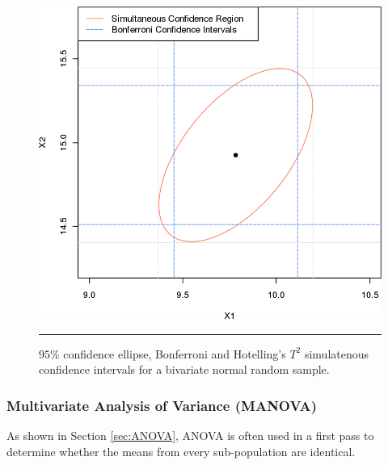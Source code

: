 \begin{figure}[!t]
\centering
  \includegraphics[width=0.5\linewidth]{images/SA/testA7.png}
  \caption[\small Confidence regions, Bonferroni and Hotelling simultaneous confidence intervals]{\small $95\%$ confidence ellipse, Bonferroni and Hotelling's ${T}^{2}$ simulatenous confidence intervals for a bivariate normal random sample.}
  \label{fig:testA7}\hrule
\end{figure}
\afterpage{\FloatBarrier}


\subsubsection{Multivariate Analysis of Variance (MANOVA)}
As shown in Section \ref{sec:ANOVA}, ANOVA is often used in a first pass to determine whether the means from every sub-population are identical.
